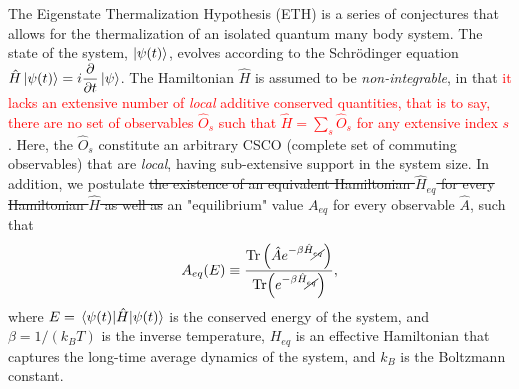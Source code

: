 \documentclass[%
reprint,
superscriptaddress,
linenumbers,
amsmath,amssymb,
aps,
prb,
showkeys,
]{revtex4-2}
\begin{document}
The Eigenstate Thermalization Hypothesis (ETH) is a series of conjectures that allows for the thermalization of an isolated quantum many body system. The state of the system, $\ket{\psi(t)}$, evolves according to the Schr\"odinger equation $\hat{H}\ket{\psi(t)} = i\displaystyle\frac{\partial}{\partial t}\ket{\psi}$. The Hamiltonian $\hat{H}$ is assumed to be \textit{non-integrable}, in that \textcolor{red}{it lacks an extensive number of \textit{local} additive conserved quantities, that is to say, there are no set of observables $\hat{O}_s$ such that $\hat{H}=\sum_s \hat{O}_s$ for any extensive index $s$}.  Here, the $\hat{O}_s$ constitute an arbitrary CSCO (complete set of commuting observables) that are \textit{local}, having sub-extensive support in the system size. In addition, we postulate \st{the existence of an equivalent Hamiltonian $\hat{H}_{eq}$ for every Hamiltonian $\hat{H}$ as well as} an "equilibrium" value $A_{eq}$ for every observable $\hat{A}$, such that
\begin{equation}
	\label{eq:aeq}
 A_{eq}(E)\equiv \frac{\Tr \left(\hat{A}e^{-\beta \hat{H}_{\cancel{eq}}}\right)}{\Tr(e^{-\beta \hat{H}_{\cancel{eq}}})},
\end{equation}
where $E=\expval{\hat{H}}{\psi(t)}$ is the conserved energy of the system, and $\beta = 1/(k_B T)$ is the inverse temperature, $H_{eq}$ is an effective Hamiltonian that captures the long-time average dynamics of the system, and $k_B$ is the Boltzmann constant.
\end{document}
